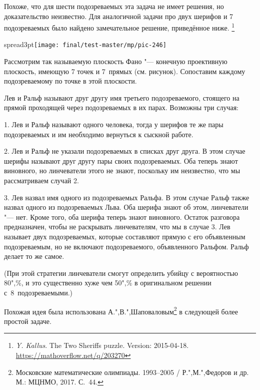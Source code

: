 \documentclass[twoside]{book}
\newenvironment{addedbytheeditors}{\par\medskip\small
}{\par\addvspace{\medskipamount}} %
\begin{document}
\begin{addedbytheeditors}
Похоже, что для шести подозреваемых эта задача не имеет решения, но
доказательство неизвестно.
Для аналогичной задачи про двух шерифов и
7 подозреваемых было найдено замечательное решение, приведённое ниже.%
\footnote{\emph{Y. Kallus}. The Two Sheriffs puzzle. Version: 2015-04-18. \url{https://mathoverflow.net/q/203270}}

\hbox spread3pt{\hss\texttt{[image: final/test-master/mp/pic-246]}}
\begin{figure}
\end{figure}


Рассмотрим так называемую плоскость Фано "--- конечную проективную плоскость, имеющую 7 точек и 7~прямых (см. рисунок).
Сопоставим каждому подозреваемому по точке в этой плоскости.


Лев и Ральф называют друг другу имя третьего подозреваемого, стоящего
на прямой проходящей через подозреваемых в их парах.
Возможны три случая:

1. Лев и Ральф называют одного человека, тогда у шерифов те же пары подозреваемых и им необходимо вернуться к сыскной работе.

2. Лев и Ральф не указали подозреваемых в списках друг друга.
В этом случае шерифы называют друг другу пары своих подозреваемых. Оба теперь знают виновного, но линчеватели этого не знают, поскольку им неизвестно, что мы рассматриваем случай 2.

3. Лев назвал имя одного из подозреваемых Ральфа.
В этом случае Ральф также назвал одного из подозреваемых Льва.
Оба шерифа знают об этом, линчеватели "--- нет.
Кроме того, оба шерифа теперь знают виновного.
Остаток разговора предназначен, чтобы не раскрывать линчевателям, что мы в случае 3.
Лев называет двух подозреваемых, которые составляют прямую с его объявленным подозреваемым, но не включают подозреваемого, объявленного Ральфом.
Ральф делает то же самое.

(При этой стратегии линчеватели смогут определить убийцу с вероятностью 80",\%, и это существенно хуже чем 50",\% в оригинальном решении с~8~подозреваемыми.)

Похожая идея была использована А.",В.",Шаповаловым\footnote{%
Московские математические олимпиады. 1993--2005 / Р.",М.",Федоров и
др. М.: \mbox{МЦНМО}, 2017. С.~44.}  в следующей более простой задаче. 


\end{addedbytheeditors}
\end{document}
